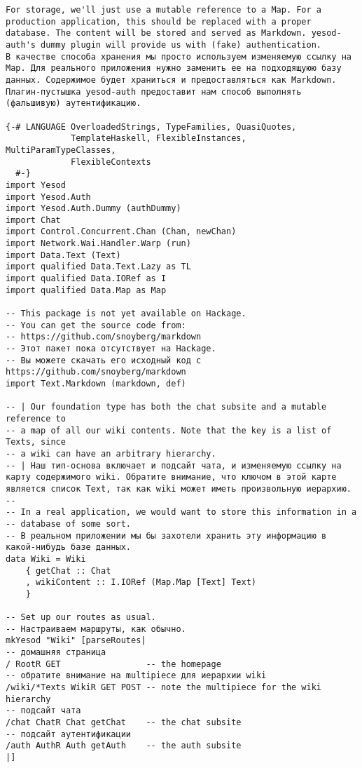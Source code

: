 \begin{lstlisting}
For storage, we'll just use a mutable reference to a Map. For a production application, this should be replaced with a proper database. The content will be stored and served as Markdown. yesod-auth's dummy plugin will provide us with (fake) authentication.
В качестве способа хранения мы просто используем изменяемую ссылку на Map. Для реального приложения нужно заменить ее на подходящуюю базу данных. Содержимое будет храниться и предоставляться как Markdown. Плагин-пустышка yesod-auth предоставит нам способ выполнять (фальшивую) аутентификацию.

{-# LANGUAGE OverloadedStrings, TypeFamilies, QuasiQuotes,
             TemplateHaskell, FlexibleInstances, MultiParamTypeClasses,
             FlexibleContexts
  #-}
import Yesod
import Yesod.Auth
import Yesod.Auth.Dummy (authDummy)
import Chat
import Control.Concurrent.Chan (Chan, newChan)
import Network.Wai.Handler.Warp (run)
import Data.Text (Text)
import qualified Data.Text.Lazy as TL
import qualified Data.IORef as I
import qualified Data.Map as Map

-- This package is not yet available on Hackage.
-- You can get the source code from:
-- https://github.com/snoyberg/markdown
-- Этот пакет пока отсутствует на Hackage.
-- Вы можете скачать его исходный код с https://github.com/snoyberg/markdown
import Text.Markdown (markdown, def)

-- | Our foundation type has both the chat subsite and a mutable reference to
-- a map of all our wiki contents. Note that the key is a list of Texts, since
-- a wiki can have an arbitrary hierarchy.
-- | Наш тип-основа включает и подсайт чата, и изменяемую ссылку на карту содержимого wiki. Обратите внимание, что ключом в этой карте является список Text, так как wiki может иметь произвольную иерархию.
--
-- In a real application, we would want to store this information in a
-- database of some sort.
-- В реальном приложении мы бы захотели хранить эту информацию в какой-нибудь базе данных.
data Wiki = Wiki
    { getChat :: Chat
    , wikiContent :: I.IORef (Map.Map [Text] Text)
    }

-- Set up our routes as usual.
-- Настраиваем маршруты, как обычно.
mkYesod "Wiki" [parseRoutes|
-- домашняя страница
/ RootR GET                 -- the homepage
-- обратите внимание на multipiece для иерархии wiki
/wiki/*Texts WikiR GET POST -- note the multipiece for the wiki hierarchy
-- подсайт чата
/chat ChatR Chat getChat    -- the chat subsite
-- подсайт аутентификации
/auth AuthR Auth getAuth    -- the auth subsite
|]


\end{lstlisting}
